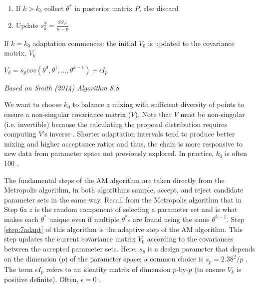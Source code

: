 \begin{tcolorbox}
\begin{enumerate}
\begin{enumerate}
\begin{itemize}
            \item If $\theta^*$ is accepted
            \begin{center}
                $\theta^k = \theta^*$, $SS_{\theta^k} = SS_{\theta^*}$
            \end{center}
            \item Else
            \begin{center}
                $\theta^k = \theta^{k-1}$, $SS_{\theta^k} = SS_{\theta^{k-1}}$
            \end{center}
        \end{itemize}
        \item If $k > k_b$ collect $\theta^*$ in posterior matrix $P$, else discard
        \item Update $s_k^2 = \frac{SS_{\theta^k}}{n-p}$
    \end{enumerate}
    \begin{tcolorbox}[colback=red!5,colframe=red!75!black,title=Adaptive Step]
    \item If $k = k_0$ adaptation commences: the initial $V_0$ is updated to the covariance matrix, $V_{k}$ \label{step:7adapt}
    \begin{center}
       $V_{k} = s_{p}cov(\theta^{0},\theta^{1},...,\theta^{k-1}) + \epsilon I_{p}$
    \end{center}
    \end{tcolorbox}
    
\end{enumerate}
\emph{Based on Smith (2014) Algorithm 8.8}
\end{tcolorbox}
\par We want to choose $k_0$ to balance a mixing with sufficient diversity of points to ensure a non-singular covariance matrix ($V$). Note that $V$ must be non-singular (i.e. invertible) because the calculating the proposal distribution requires computing $V$'s inverse \cite{WallinBolin2018nonsingcov}. Shorter adaptation intervals tend to produce better mixing and higher acceptance ratios \cite{convergence_mixing} and thus, the chain is more responsive to new data from parameter space not previously explored. In practice, $k_0$ is often 100 \cite{smithCh8}. 
\par The fundamental steps of the AM algorithm are taken directly from the Metropolis algorithm, in both algorithms sample, accept, and reject candidate parameter sets in the same way. Recall from the Metropolis algorithm that in Step 6a $z$ is the random component of selecting a parameter set and is what makes each $\theta^*$ unique even if multiple $\theta^*$s are found using the same $\theta^{k-1}$. Step \ref{step:7adapt} of this algorithm is the adaptive step of the AM algorithm. This step updates the current covariance matrix $V_0$ according to the covariances between the accepted parameter sets. Here, $s_{p}$ is a design parameter that depends on the dimension ($p$) of the parameter space; a common choice is $s_{p} = 2.38^{2}/p$ \cite{smithCh8}. The term $\epsilon I_{p}$ refers to an identity matrix of dimension $p$-by-$p$ (to ensure $V_{k}$ is positive definite). Often, $\epsilon = 0$ \cite{smithCh8}.
